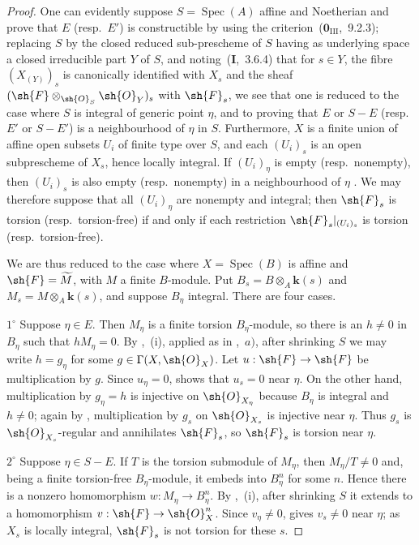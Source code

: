 \begin{proof}
One can evidently suppose $S=\operatorname{Spec}(A)$ affine and Noetherian and prove that $E$ (resp.\ $E'$) is constructible by using the criterion~($\mathbf{0}_{\mathrm{III}}$,~9.2.3); replacing $S$ by the closed reduced sub-prescheme of $S$ having as underlying space a closed irreducible part $Y$ of $S$, and noting~(\textbf{I},~3.6.4) that for $s\in Y$, the fibre $(X_{(Y)})_s$ is canonically identified with $X_s$ and the sheaf $(\sh{F}\otimes_{\sh{O}_S}\sh{O}_Y)_s$ with $\sh{F}_s$, we see that one is reduced to the case where $S$ is integral of generic point $\eta$, and to proving that $E$ or $S-E$ (resp.\ $E'$ or $S-E'$) is a neighbourhood of $\eta$ in $S$.
Furthermore, $X$ is a finite union of affine open subsets $U_i$ of finite type over $S$, and each $(U_i)_s$ is an open subprescheme of $X_s$, hence locally integral. If $(U_i)_\eta$ is empty (resp.\ nonempty), then $(U_i)_s$ is also empty (resp.\ nonempty) in a neighbourhood of $\eta$ . We may therefore suppose that all $(U_i)_\eta$ are nonempty and integral; then $\sh{F}_s$ is torsion (resp.\ torsion-free) if and only if each restriction $\sh{F}_s|_{(U_i)_s}$ is torsion (resp.\ torsion-free).

We are thus reduced to the case where $X=\operatorname{Spec}(B)$ is affine and $\sh{F}=\widetilde{M}$, with $M$ a finite $B$-module. Put $B_s=B\otimes_A\mathbf{k}(s)$ and $M_s=M\otimes_A\mathbf{k}(s)$, and suppose $B_\eta$ integral. There are four cases.

$1^\circ$ Suppose $\eta\in E$. Then $M_\eta$ is a finite torsion $B_\eta$-module, so there is an $h\neq 0$ in $B_\eta$ such that $hM_\eta=0$. By ,~(i), applied as in ,~$a)$, after shrinking $S$ we may write $h=g_\eta$ for some $g\in\Gamma(X,\sh{O}_X)$. Let $u:\sh{F}\to\sh{F}$ be multiplication by $g$. Since $u_\eta=0$,  shows that $u_s=0$ near $\eta$. On the other hand, multiplication by $g_\eta=h$ is injective on $\sh{O}_{X_\eta}$ because $B_\eta$ is integral and $h\neq 0$; again by , multiplication by $g_s$ on $\sh{O}_{X_s}$ is injective near $\eta$. Thus $g_s$ is $\sh{O}_{X_s}$-regular and annihilates $\sh{F}_s$, so $\sh{F}_s$ is torsion near $\eta$.


$2^\circ$ Suppose $\eta\in S-E$. If $T$ is the torsion submodule of $M_\eta$, then $M_\eta/T\neq 0$ and, being a finite torsion-free $B_\eta$-module, it embeds into $B_\eta^n$ for some $n$. Hence there is a nonzero homomorphism $w:M_\eta\to B_\eta^n$. By ,~(i), after shrinking $S$ it extends to a homomorphism $v:\sh{F}\to\sh{O}_X^n$. Since $v_\eta\neq 0$,  gives $v_s\neq 0$ near $\eta$; as $X_s$ is locally integral, $\sh{F}_s$ is not torsion for these $s$.


\end{proof}
